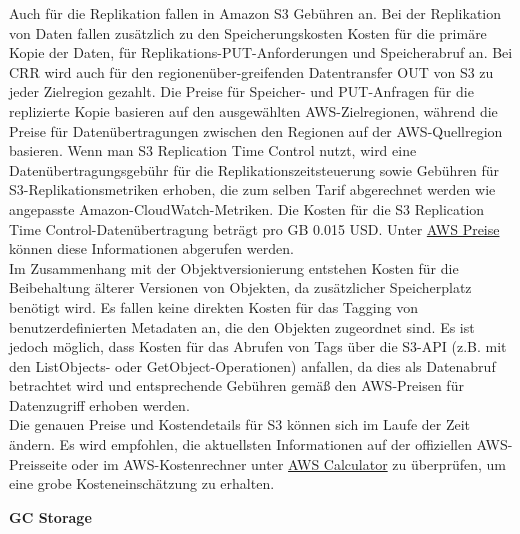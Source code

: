 Auch für die Replikation fallen in Amazon S3 Gebühren an. Bei der Replikation von Daten fallen zusätzlich zu den Speicherungskosten Kosten für die primäre Kopie der Daten, für Replikations-PUT-Anforderungen und Speicherabruf an. Bei CRR wird auch für den regionenüber-greifenden Datentransfer OUT von S3 zu jeder Zielregion gezahlt. Die Preise für Speicher- und PUT-Anfragen für die replizierte Kopie basieren auf den ausgewählten AWS-Zielregionen, während die Preise für Datenübertragungen zwischen den Regionen auf der AWS-Quellregion basieren. Wenn man S3 Replication Time Control nutzt, wird eine Datenübertragungsgebühr für die Replikationszeitsteuerung sowie Gebühren für S3-Replikationsmetriken erhoben, die zum selben Tarif abgerechnet werden wie angepasste Amazon-CloudWatch-Metriken. Die Kosten für die S3 Replication Time Control-Datenübertragung beträgt pro GB 0.015 USD. Unter \href{https://aws.amazon.com/de/s3/pricing/}{AWS Preise} können diese Informationen abgerufen werden.\\

Im Zusammenhang mit der Objektversionierung entstehen Kosten für die Beibehaltung älterer Versionen von Objekten, da zusätzlicher Speicherplatz benötigt wird. Es fallen keine direkten Kosten für das Tagging von benutzerdefinierten Metadaten an, die den Objekten zugeordnet sind. Es ist jedoch möglich, dass Kosten für das Abrufen von Tags über die S3-API (z.B. mit den ListObjects- oder GetObject-Operationen) anfallen, da dies als Datenabruf betrachtet wird und entsprechende Gebühren gemäß den AWS-Preisen für Datenzugriff erhoben werden.\\

Die genauen Preise und Kostendetails für S3 können sich im Laufe der Zeit ändern. Es wird empfohlen, die aktuellsten Informationen auf der offiziellen AWS-Preisseite oder im AWS-Kostenrechner unter \href{https://calculator.aws/}{AWS Calculator} zu überprüfen, um eine grobe Kosteneinschätzung zu erhalten.

\newpage

\textbf{GC Storage}\\

